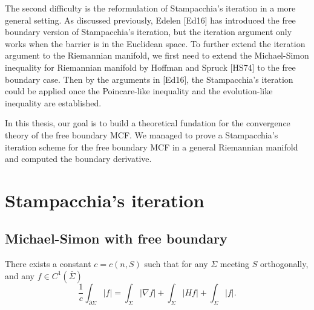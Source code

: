 The second difficulty is the reformulation of Stampacchia's iteration in a more general setting. As discussed previously, Edelen [Ed16] has introduced the free boundary version of Stampacchia's iteration, but the iteration argument only works when the barrier is in the Euclidean space. To further extend the iteration argument to the Riemannian manifold, we first need to extend the Michael-Simon inequality for Riemannian manifold by Hoffman and Spruck [HS74] to the free boundary case. Then by the arguments in [Ed16], the Stampacchia's iteration could be applied once the Poincare-like inequality and the evolution-like inequality are established.

In this thesis, our goal is to build a theoretical fundation for the convergence theory of the free boundary MCF. We managed to prove a Stampacchia's iteration scheme for the free boundary MCF in a general Riemannian manifold and computed the boundary derivative.

\section{Stampacchia's iteration}
\subsection{Michael-Simon with free boundary}

\begin{lemma}\label{BoundaryIntegral}
    There exists a constant $c=c(n,S)$ such that for any $\Sigma $ meeting $S$ orthogonally, and any $f \in C^1(\bar{\Sigma })$ 
    \[
        \frac{1}{c}\int_{\partial \Sigma } \left| f \right| =\int_{ \Sigma} \left| \nabla f \right| + \int_{ \Sigma} \left| Hf \right| + \int_{ \Sigma} \left| f \right| .   
    \]
\end{lemma}

